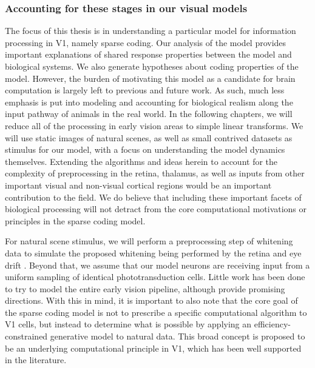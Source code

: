 \subsubsection{Accounting for these stages in our visual models}
The focus of this thesis is in understanding a particular model for information processing in V1, namely sparse coding. Our analysis of the model provides important explanations of shared response properties between the model and biological systems. We also generate hypotheses about coding properties of the model. However, the burden of motivating this model as a candidate for brain computation is largely left to previous and future work. As such, much less emphasis is put into modeling and accounting for biological realism along the input pathway of animals in the real world. In the following chapters, we will reduce all of the processing in early vision areas to simple linear transforms. We will use static images of natural scenes, as well as small contrived datasets as stimulus for our model, with a focus on understanding the model dynamics themselves. Extending the algorithms and ideas herein to account for the complexity of preprocessing in the retina, thalamus, as well as inputs from other important visual and non-visual cortical regions would be an important contribution to the field. We do believe that including these important facets of biological processing will not detract from the core computational motivations or principles in the sparse coding model.

For natural scene stimulus, we will perform a preprocessing step of whitening data  \citeyearpar{olshausen1997sparse} to simulate the proposed whitening being performed by the retina and eye drift \parencite{atick1992what, rucci2015unsteady}. Beyond that, we assume that our model neurons are receiving input from a uniform sampling of identical phototransduction cells. Little work has been done to try to model the entire early vision pipeline, although \parencite{shan2013efficient, doi2007theory, lindsey2019unified} provide promising directions. With this in mind, it is important to also note that the core goal of the sparse coding model is not to prescribe a specific computational algorithm to V1 cells, but instead to determine what is possible by applying an efficiency-constrained generative model to natural data. This broad concept is proposed to be an underlying computational principle in V1, which has been well supported in the literature.

